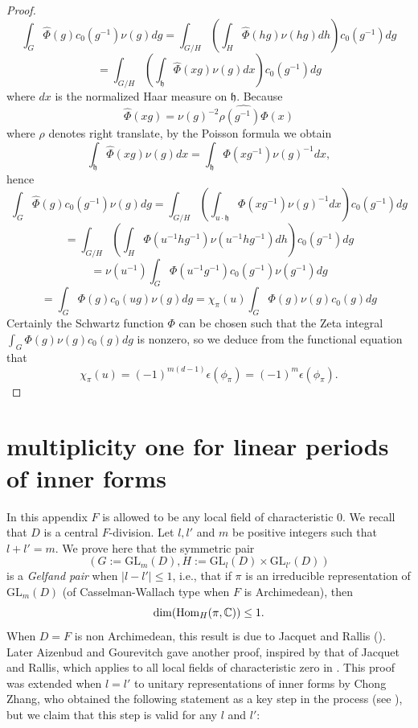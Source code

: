 \documentclass[11pt,letterpaper]{amsart}
\newcommand{\GL}{{\mathrm {GL}}} \newcommand{\PGL}{{\mathrm {PGL}}}
\newcommand{\Hom}{\mathrm{Hom}}
\def\e{\epsilon}
\theoremstyle{plain}
\numberwithin{equation}{section}
\begin{document}
\begin{proof}
\[\int_G  \widehat{\Phi}(g)c_0(g^{-1}) \nu(g)dg=\int_{G/H} (\int_H \widehat{\Phi}(hg) \nu(hg) dh) c_0(g^{-1})dg\]
\[=\int_{G/H} (\int_{\mathfrak{h}} \widehat{\Phi}(xg) \nu(g) dx) c_0(g^{-1})dg\] where $dx$ is the normalized Haar measure on $\mathfrak{h}$. Because \[\widehat{\Phi}(xg)=\nu(g)^{-2}\widehat{\rho(g^{-1})\Phi}(x)\] where $\rho$ denotes right translate, by the Poisson formula we obtain  
\[\int_{\mathfrak{h}} \widehat{\Phi}(xg)  \nu(g)dx=\int_{\mathfrak{h}}\Phi(xg^{-1}) \nu(g)^{-1} dx,\] hence 
\[\int_G  \widehat{\Phi}(g)c_0(g^{-1}) \nu(g)dg= 
\int_{G/H} (\int_{u\cdot\mathfrak{h}}\Phi(xg^{-1}) \nu(g)^{-1} dx) c_0(g^{-1})dg\]
\[=\int_{G/H} (\int_{H}\Phi(u^{-1}hg^{-1}) \nu(u^{-1}hg^{-1}) dh) c_0(g^{-1})dg\]
\[=\nu(u^{-1})\int_G \Phi(u^{-1}g^{-1})  c_0(g^{-1})\nu(g^{-1}) dg\]
\[=\int_G \Phi(g)  c_0(ug)\nu(g)dg=\chi_{\pi}(u)\int_G \Phi(g) \nu(g)c_0(g)dg\]
Certainly the Schwartz function $\Phi$ can be chosen such that the Zeta integral $\int_G \Phi(g) \nu(g)c_0(g)dg$ is nonzero, so we deduce from the functional equation that 
\[\chi_{\pi}(u)=(-1)^{m(d-1)}\e(\phi_{\pi})=(-1)^m\e(\phi_{\pi}).\]
\end{proof}

\appendix
\section{multiplicity one for linear periods of inner forms}\label{app mult 1}

In this appendix $F$ is allowed to be any local field of characteristic $0$. We recall that $D$ is a central $F$-division. Let $l,l'$ and $m$ be positive integers such that $l + l' =m$. We prove here that the symmetric pair \[(G:=\GL_m(D),H:=\GL_l(D) \times \GL_{l'}(D))\] is a \textit{Gelfand pair} when $|l-l'|\leq 1$, i.e., that if $\pi$ is an irreducible representation of $\GL_m(D)$ (of Casselman-Wallach type when $F$ is Archimedean), then 
\[\dim(\Hom_{H}(\pi,\BC))\leq 1.\] When $D=F$ is non Archimedean, this result is due to Jacquet and Rallis (\cite{JR}). Later Aizenbud and Gourevitch gave another proof, inspired by that of Jacquet and Rallis, which applies to all local fields of characteristic zero in 
\cite[Theorem 8.2.4]{Aizenbud-Gourevitch}. This proof was extended when $l=l'$ to unitary representations of inner forms by Chong Zhang, who obtained the following statement as a key step in the process (see \cite[Proposition 4.3 and Remark 4.7]{Zlinear}), but we claim that this step is valid for any $l$ and $l'$:
\end{document}

